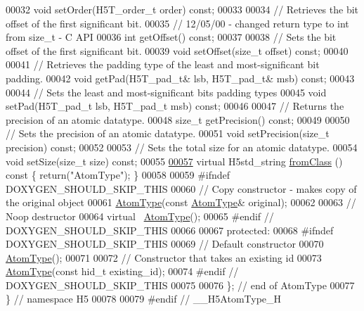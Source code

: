 \begin{DoxyCode}
00032         \textcolor{keywordtype}{void} setOrder(H5T\_order\_t order) \textcolor{keyword}{const};
00033 
00034         \textcolor{comment}{// Retrieves the bit offset of the first significant bit.}
00035         \textcolor{comment}{// 12/05/00 - changed return type to int from size\_t - C API}
00036         \textcolor{keywordtype}{int} getOffset() \textcolor{keyword}{const};
00037 
00038         \textcolor{comment}{// Sets the bit offset of the first significant bit.}
00039         \textcolor{keywordtype}{void} setOffset(\textcolor{keywordtype}{size\_t} offset) \textcolor{keyword}{const};
00040 
00041         \textcolor{comment}{// Retrieves the padding type of the least and most-significant bit padding.}
00042         \textcolor{keywordtype}{void} getPad(H5T\_pad\_t& lsb, H5T\_pad\_t& msb) \textcolor{keyword}{const};
00043 
00044         \textcolor{comment}{// Sets the least and most-significant bits padding types}
00045         \textcolor{keywordtype}{void} setPad(H5T\_pad\_t lsb, H5T\_pad\_t msb) \textcolor{keyword}{const};
00046 
00047         \textcolor{comment}{// Returns the precision of an atomic datatype.}
00048         \textcolor{keywordtype}{size\_t} getPrecision() \textcolor{keyword}{const};
00049 
00050         \textcolor{comment}{// Sets the precision of an atomic datatype.}
00051         \textcolor{keywordtype}{void} setPrecision(\textcolor{keywordtype}{size\_t} precision) \textcolor{keyword}{const};
00052 
00053         \textcolor{comment}{// Sets the total size for an atomic datatype.}
00054         \textcolor{keywordtype}{void} setSize(\textcolor{keywordtype}{size\_t} size) \textcolor{keyword}{const};
00055 
\hyperlink{class_h5_1_1_atom_type_a78b16fea33b398b689fd8c8512f59f49}{00057}         \textcolor{keyword}{virtual} H5std\_string \hyperlink{class_h5_1_1_atom_type_a78b16fea33b398b689fd8c8512f59f49}{fromClass} ()\textcolor{keyword}{ const }\{ \textcolor{keywordflow}{return}(\textcolor{stringliteral}{"AtomType"}); \}
00058 
00059 \textcolor{preprocessor}{#ifndef DOXYGEN\_SHOULD\_SKIP\_THIS}
00060         \textcolor{comment}{// Copy constructor - makes copy of the original object}
00061         \hyperlink{class_h5_1_1_atom_type}{AtomType}(\textcolor{keyword}{const} \hyperlink{class_h5_1_1_atom_type}{AtomType}& original);
00062 
00063         \textcolor{comment}{// Noop destructor}
00064         \textcolor{keyword}{virtual} ~\hyperlink{class_h5_1_1_atom_type}{AtomType}();
00065 \textcolor{preprocessor}{#endif // DOXYGEN\_SHOULD\_SKIP\_THIS}
00066 
00067    \textcolor{keyword}{protected}:
00068 \textcolor{preprocessor}{#ifndef DOXYGEN\_SHOULD\_SKIP\_THIS}
00069         \textcolor{comment}{// Default constructor}
00070         \hyperlink{class_h5_1_1_atom_type}{AtomType}();
00071 
00072         \textcolor{comment}{// Constructor that takes an existing id}
00073         \hyperlink{class_h5_1_1_atom_type}{AtomType}(\textcolor{keyword}{const} hid\_t existing\_id);
00074 \textcolor{preprocessor}{#endif // DOXYGEN\_SHOULD\_SKIP\_THIS}
00075 
00076 \}; \textcolor{comment}{// end of AtomType}
00077 \} \textcolor{comment}{// namespace H5}
00078 
00079 \textcolor{preprocessor}{#endif // \_\_H5AtomType\_H}
\end{DoxyCode}
